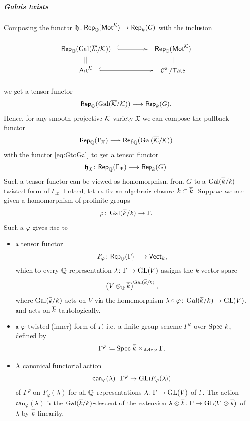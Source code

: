 \documentclass[twoside,leqno]{article}
\numberwithin{equation}{section}
\theoremstyle{plain}
\theoremstyle{definition}
\begin{document}
\subparagraph{Galois twists} \label{subpar:galois}

Composing the functor $\boldsymbol{\mathfrak{h}} \colon \mathsf{Rep}_{\mathbb Q}(\mathsf{Mot}^{\mathcal K}) \to
 \mathsf{Rep}_{k}(G)$ with the inclusion
\[
\xymatrix@R-3.5pc@M+0.7pc@C+1.5pc{
  \mathsf{Rep}_{\bbQ}(\Gal(\kaybar/\kay))  \ar@{^{(}->}[r]
  & \mathsf{Rep}_{\bbQ}(\motM^{\kay})  \\
|| & ||  \\
\mathsf{Art}^{\kay} \ar@{^{(}->}[r] & \CA{\kay}/\mathsf{Tate}  
}
\]
we get a tensor functor
\begin{equation} \label{eq:GtoGal}
  \mathsf{Rep}_{\mathbb Q}(\operatorname{Gal}(\overline{\mathcal K}/\mathcal K)) \longrightarrow \mathsf{Rep}_{k}(G).
\end{equation}
Hence, for any smooth projective $\mathcal K$-variety $\mathfrak{X}$ we can
compose the pullback functor 
\[
\mathsf{Rep}_{\mathbb Q}(\Gamma_{\mathfrak{X}}) \longrightarrow
\mathsf{Rep}_{\mathbb Q}(\operatorname{Gal}(\overline{\mathcal K}/\mathcal K))
\]
with the functor \eqref{eq:GtoGal}
to get a tensor functor 
 \begin{equation} \label{eq:GtoGamma}
   \boldsymbol{\mathfrak{h}}_{\mathfrak{X}} \colon
   \mathsf{Rep}_{\mathbb Q}(\Gamma_{\mathfrak{X}}) \longrightarrow \mathsf{Rep}_{k}(G).
 \end{equation}
Such a tensor functor can be viewed as homomorphism from $G$ to a
$\operatorname{Gal}(\overline{k}/k)$-twisted form of $\Gamma_{\mathfrak{X}}$. Indeed, let
us fix an algebraic closure $k \subset \overline{k}$.  Suppose we are given a
homomorphism of profinite groups
\[
\varphi \colon \operatorname{Gal}(\overline{k}/k) \to \Gamma.
\]
Such a $\varphi$ gives rise to
\begin{itemize}[wide]
\item[(a)] a tensor functor
\[
F_{\varphi} \colon \mathsf{Rep}_{\mathbb Q}(\Gamma) \longrightarrow \mathsf{Vect}_{k},
\]
which to every $\mathbb Q$-representation $\lambda \colon \Gamma \to \operatorname{GL}(V)$ assigns
the $k$-vector space 
\[
\left(V\otimes_{\mathbb Q} \overline{k}\right)^{\operatorname{Gal}(\overline{k}/k)},
\]
where $\operatorname{Gal}(\overline{k}/k)$ acts on $V$ via the homomorphism $\lambda\circ
\varphi \colon \operatorname{Gal}(\overline{k}/k) \to \operatorname{GL}(V)$, and acts on $\overline{k}$
  tautologically.
\item[(b)] a $\varphi$-twisted (inner) form of $\Gamma$, i.e.\ a
  finite group scheme $\Gamma^{\varphi}$ over $\operatorname{Spec}\, k$,  defined by
\[
\Gamma^{\varphi} \coloneqq \operatorname{Spec}\, \overline{k} \times_{\operatorname{Ad}\circ \varphi} \Gamma. 
\]
\item[(c)] A canonical functorial action
  \[
  \mathsf{can}_{\varphi}(\lambda) \colon \Gamma^{\varphi} \to \operatorname{GL}(F_{\varphi}(\lambda))
  \]
  of $\Gamma^{\varphi}$ on
  $F_{\varphi}(\lambda)$ for all $\mathbb Q$-representations $\lambda \colon
  \Gamma \to \operatorname{GL}(V)$ of $\Gamma$. The action $\mathsf{can}_{\varphi}(\lambda)$
  is the
  $\operatorname{Gal}(\overline{k}/k)$-descent of the extension $\lambda\otimes {\overline{k}} \colon \Gamma
  \to \operatorname{GL}(V\otimes \overline{k})$ of $\lambda$ by $\overline{k}$-linearity.
\end{itemize}
\end{document}

